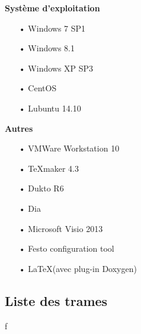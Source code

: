 \documentclass[10pt,a4paper,final]{article}
\begin{document}
\begin{spacing}{1.5}
\begin{flushleft}
\begin{multicols}{3}
\bigskip

\textbf{Système d'exploitation}
\begin{itemize}
\item[•]Windows 7 SP1
\item[•]Windows 8.1
\item[•]Windows XP SP3
\item[•]CentOS
\item[•]Lubuntu 14.10
\end{itemize}

\textbf{Autres}
\begin{itemize}
\item[•]VMWare Workstation 10
\item[•]TeXmaker 4.3
\item[•]Dukto R6
\item[•]Dia
\item[•]Microsoft Visio 2013
\item[•]Festo configuration tool
\item[•]\LaTeX (avec plug-in Doxygen)
\end{itemize}

\end{multicols}
\end{flushleft}
\begin{flushleft}
\HRule
\end{flushleft}

\pagebreak
\subsection{Liste des trames}


\end{spacing}
f
\end{document}
